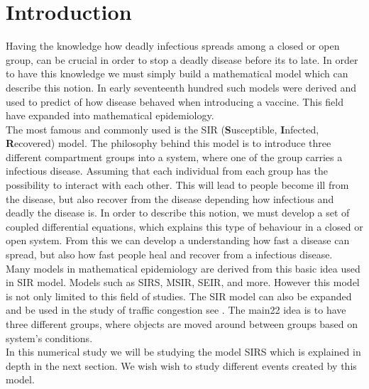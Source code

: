 \documentclass[a4paper, 10pt]{article}
\begin{document}
\section{Introduction}
Having the knowledge how deadly infectious spreads among a closed or open group,
can be crucial in order to stop a deadly disease before its to late. In order to have
this knowledge we must simply build a mathematical model which can describe this notion.
In early seventeenth hundred such models were derived and used to predict of how disease behaved
when introducing a vaccine. This field have expanded into mathematical epidemiology.
\vspace{3mm}
\\
The most famous and
commonly used is the SIR (\textbf{S}usceptible, \textbf{I}nfected, \textbf{R}ecovered) model.
The philosophy behind this model is to introduce three different compartment groups into a system,
where one of the group carries a infectious disease. Assuming that each individual from each group has the possibility
to interact with each other. This will lead to people become ill from the disease, but also recover from the disease
depending how infectious and deadly the disease is. In order to describe this notion, we must develop
a set of coupled differential equations, which explains this type of behaviour in a closed or open system.
From this we can develop a understanding
how fast a disease can spread, but also how fast people heal and recover from a infectious disease.
\vspace{3mm}
\\
Many models in mathematical epidemiology are derived from this basic idea used in SIR model. Models such as SIRS, MSIR, SEIR, and more.
However this model is not only
limited to this field of studies. The SIR model can also be expanded and be used in the study of
traffic congestion see \cite{WU}. The main22
idea is to have three different groups, where objects are moved around between
groups based on system's conditions.
\vspace{3mm}
\\
In this numerical study we will be studying the model SIRS which is explained in depth in the next section.
We wish wish to study different events created by this model.
\end{document}
